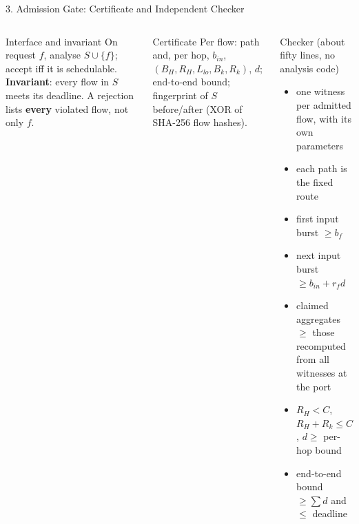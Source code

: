 \documentclass[xcolor=x11names,t,aspectratio=169]{beamer}
\begin{document}
\begin{frame}{3. Admission Gate: Certificate and Independent Checker}
\small
\begin{columns}[T,totalwidth=\textwidth]
\begin{block}{Interface and invariant}
On request $f$, analyse $S\cup\{f\}$; accept iff it is schedulable. \textbf{Invariant}: every flow in $S$ meets its deadline. A rejection lists \textbf{every} violated flow, not only $f$.
\end{block}
\begin{block}{Certificate}
Per flow: path and, per hop, $b_{in}$, $(B_H,R_H,L_{lo},B_k,R_k)$, $d$; end-to-end bound; fingerprint of $S$ before/after (XOR of SHA-256 flow hashes).
\end{block}
\begin{block}{Checker (about fifty lines, no analysis code)}
\footnotesize
\begin{itemize}
  \item[C0] one witness per admitted flow, with its own parameters
  \item[C1] each path is the fixed route
  \item[C2] first input burst $\ge b_f$
  \item[C3] next input burst $\ge b_{in}+r_f d$
  \item[C4] claimed aggregates $\ge$ those recomputed from all witnesses at the port
  \item[C5] $R_H<C$, $R_H+R_k\le C$, $d\ge$ per-hop bound
  \item[C6] end-to-end bound $\ge\sum d$ and $\le$ deadline
\end{itemize}
\end{block}
\end{columns}
\end{frame}
\end{document}

